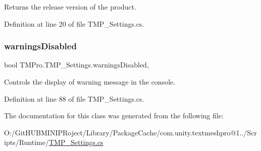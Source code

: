 Returns the release version of the product. 



Definition at line 20 of file T\+M\+P\+\_\+\+Settings.\+cs.

\mbox{\label{class_t_m_pro_1_1_t_m_p___settings_a457e0b045af04f8bb1bfad4614dcab49}} 
\subsubsection{\texorpdfstring{warningsDisabled}{warningsDisabled}}
{\footnotesize\ttfamily bool T\+M\+Pro.\+T\+M\+P\+\_\+\+Settings.\+warnings\+Disabled\hspace{0.3cm}{\ttfamily [static]}, {\ttfamily [get]}}



Controls the display of warning message in the console. 



Definition at line 88 of file T\+M\+P\+\_\+\+Settings.\+cs.



The documentation for this class was generated from the following file\+:\begin{DoxyCompactItemize}
\item 
O\+:/\+Git\+H\+U\+B\+M\+I\+N\+I\+P\+Roject/\+Library/\+Package\+Cache/com.\+unity.\+textmeshpro@1../\+Scripts/\+Runtime/\mbox{\hyperlink{_t_m_p___settings_8cs}{T\+M\+P\+\_\+\+Settings.\+cs}}\end{DoxyCompactItemize}

